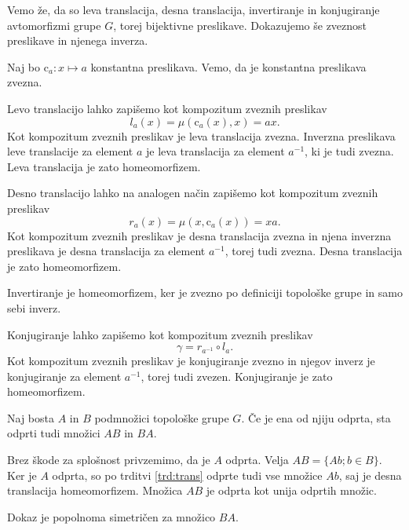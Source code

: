 \documentclass[mat1]{fmfdelo}
\begin{document}
\begin{dokaz}
Vemo že, da so leva translacija, desna translacija, invertiranje in konjugiranje avtomorfizmi grupe $G$, torej bijektivne preslikave. Dokazujemo še zveznost preslikave in njenega inverza.

Naj bo $\text{c}_a\colon x \mapsto a$ konstantna preslikava. Vemo, da je konstantna preslikava zvezna.

Levo translacijo lahko zapišemo kot kompozitum zveznih preslikav \[l_a(x) = \mu(\text{c}_a(x), x) = ax.\]
Kot kompozitum zveznih preslikav je leva translacija zvezna. Inverzna preslikava leve translacije za element $a$ je leva translacija za element $a^{-1}$, ki je tudi zvezna. Leva translacija je zato homeomorfizem.

Desno translacijo lahko na analogen način zapišemo kot kompozitum zveznih preslikav \[r_a(x) = \mu(x, \text{c}_a(x)) = xa.\]
Kot kompozitum zveznih preslikav je desna translacija zvezna in njena inverzna preslikava je desna translacija za element $a^{-1}$, torej tudi zvezna. Desna translacija je zato homeomorfizem.

Invertiranje je homeomorfizem, ker je zvezno po definiciji topološke grupe in samo sebi inverz.

Konjugiranje lahko zapišemo kot kompozitum zveznih preslikav \[\gamma = r_{a^{-1}} \circ l_a.\]
Kot kompozitum zveznih preslikav je konjugiranje zvezno in njegov inverz je konjugiranje za element $a^{-1}$, torej tudi zvezen. Konjugiranje je zato homeomorfizem.
\end{dokaz}

\begin{trditev}\label{trd:prododp}
Naj bosta $A$ in $B$ podmnožici topološke grupe $G$. Če je ena od njiju odprta, sta odprti tudi množici $AB$ in $BA$.
\end{trditev}

\begin{dokaz}
Brez škode za splošnost privzemimo, da je $A$ odprta. Velja $AB = \lbrace Ab ; b \in B \rbrace$. Ker je $A$ odprta, so po trditvi \ref{trd:trans} odprte tudi vse množice $Ab$, saj je desna translacija homeomorfizem. Množica $AB$ je odprta kot unija odprtih množic.

Dokaz je popolnoma simetričen za množico $BA$.
\end{dokaz}
\end{document}
